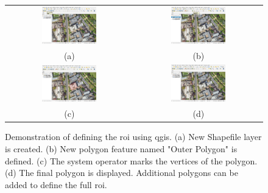 \begin{figure}[h]
    \centering
    \begin{tabular}{cc}
        \includegraphics[width=0.45\textwidth]{figs/Jihwan/qgis_a.png} &
        \includegraphics[width=0.45\textwidth]{figs/Jihwan/qgis_b.png} \\
        (a) & (b) \\[10pt]
        \includegraphics[width=0.45\textwidth]{figs/Jihwan/qgis_c.png} &
        \includegraphics[width=0.45\textwidth]{figs/Jihwan/qgis_d.png} \\
        (c) & (d)
    \end{tabular}
    \caption[Demonstration of \gls{roi} Definition using \gls{qgis}]
    {Demonstration of defining the \gls{roi} using \gls{qgis}. (a) New Shapefile layer is created. (b) New polygon feature named "Outer Polygon" is defined. (c) The system operator marks the vertices of the polygon. (d) The final polygon is displayed. Additional polygons can be added to define the full \gls{roi}.}
    \label{fig:msp_qgis}
\end{figure}

